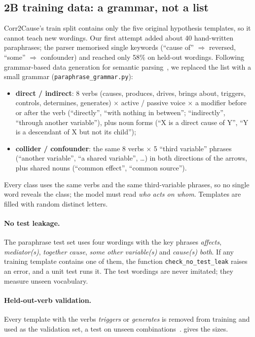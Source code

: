 \documentclass[12pt,a4paper]{article}
\newcommand{\code}[1]{\texttt{#1}}
\begin{document}
\subsection{2B training data: a grammar, not a list}\label{sec:data2b}
Corr2Cause's train split contains only the five original hypothesis templates, so it cannot teach new wordings. Our first
attempt added about 40 hand-written paraphrases; the parser memorised single keywords (``cause of'' $\Rightarrow$ reversed,
``some'' $\Rightarrow$ confounder) and reached only 58\% on held-out wordings. Following grammar-based data generation for
semantic parsing~\cite{wang2015,jia2016}, we replaced the list with a small grammar (\code{paraphrase\_grammar.py}):
\begin{itemize}
  \item \textbf{direct / indirect}: 8 verbs (causes, produces, drives, brings about, triggers, controls, determines, generates)
        $\times$ active / passive voice $\times$ a modifier before or after the verb (``directly'', ``with nothing in between'';
        ``indirectly'', ``through another variable''), plus noun forms (``X is a direct cause of Y'', ``Y is a descendant of X but
        not its child'');
  \item \textbf{collider / confounder}: the same 8 verbs $\times$ 5 ``third variable'' phrases (``another variable'', ``a shared
        variable'', \dots) in both directions of the arrows, plus shared nouns (``common effect'', ``common source'').
\end{itemize}
Every class uses the same verbs and the same third-variable phrases, so no single word reveals the class; the model must read
\emph{who acts on whom}. Templates are filled with random distinct letters.

\paragraph{No test leakage.} The paraphrase test set uses four wordings with the key phrases \emph{affects}, \emph{mediator(s)},
\emph{together cause}, \emph{some other variable(s)} and \emph{cause(s) both}. If any training template contains one of
them, the function \code{check\_no\_test\_leak} raises an error, and a unit test runs it. The test wordings are never imitated; they measure unseen
vocabulary.

\paragraph{Held-out-verb validation.} Every template with the verbs \emph{triggers} or \emph{generates} is removed from training
and used as the validation set, a test on unseen combinations~\cite{lake2018}.  gives the sizes.
\end{document}
